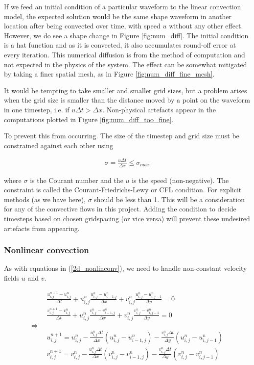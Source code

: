\documentclass[11pt]{article}
\begin{document}
{If we feed an initial condition of a particular waveform to the linear convection model,
the expected solution would be the same shape waveform in another location after being
convected over time, with speed $u$ without any other effect. However, we do see a shape
change in Figure \ref{fig:num_diff}. The initial condition is a hat function
and as it is convected, it also accumulates round-off error at every iteration. This
numerical diffusion is from the method of computation and not expected in the physics
of the system. The effect can be somewhat mitigated by taking a finer spatial mesh,
as in Figure \ref{fig:num_diff_fine_mesh}.

It would be tempting to take smaller and smaller grid sizes, but a problem arises when
the grid size is smaller than the distance moved by a point on the waveform in one
timestep, i.e. if $u\Delta t > \Delta x$. Non-physical artefacts appear in the computations
plotted in Figure \ref{fig:num_diff_too_fine}.

To prevent this from occurring. The size of the timestep and grid size must be constrained
against each other using

\begin{align}
\sigma = \frac{u \Delta t}{\Delta x} \leq \sigma_{max}
\end{align}

where $\sigma$ is the Courant number and the $u$ is the speed (non-negative).
The constraint is called the Courant-Friedrichs-Lewy or CFL condition.
For explicit methods (as we have here), $\sigma$ should be less than 1.
This will be a consideration for any of the convective flows in this project.
Adding the condition to decide timesteps based on chosen gridspacing (or vice versa)
will prevent these undesired artefacts from appearing.

\subsubsection{Nonlinear convection}
As with equations in (\ref{2d_nonlinconv}), we need to handle non-constant velocity
fields $u$ and $v$.

\begin{align}
&\frac{u^{n+1}_{i,j} - u^{n}_{i,j}}{\Delta t}
	+ u^n_{i,j} \frac{u^{n}_{i,j} - u^{n}_{i-1,j}}{\Delta x}
	+ v^n_{i,j} \frac{u^{n}_{i,j} - u^{n}_{i,j-1}}{\Delta y} = 0	\nonumber \\
&\frac{v^{n+1}_{i,j} - v^{n}_{i,j}}{\Delta t}
	+ u^n_{i,j} \frac{v^{n}_{i,j} - v^{n}_{i-1,j}}{\Delta x}
	+ v^n_{i,j} \frac{v^{n}_{i,j} - v^{n}_{i,j-1}}{\Delta y} = 0 \\
\Rightarrow ~~ \nonumber \\
&u^{n+1}_{i,j} = u^n_{i,j}
				- \frac{u^n_{i,j} \Delta t}{\Delta x}(u^n_{i,j} - u^n_{i-1,j})
				- \frac{v^n_{i,j} \Delta t}{\Delta y}(u^n_{i,j} - u^n_{i,j-1})
																 \nonumber \\
&v^{n+1}_{i,j} = v^n_{i,j}
				- \frac{u^n_{i,j} \Delta t}{\Delta x}(v^n_{i,j} - v^n_{i-1,j})
				- \frac{v^n_{i,j} \Delta t}{\Delta y}(v^n_{i,j} - v^n_{i,j-1})
\end{align}

}
\end{document}
